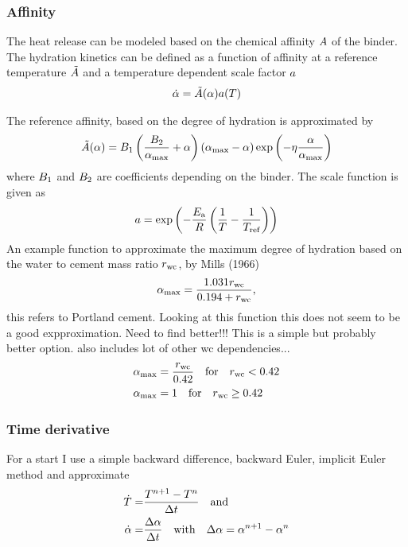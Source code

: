\subsubsection{Affinity}
The heat release can be modeled based on the chemical affinity $A$ of the binder.
The hydration kinetics can be defined as a function of affinity at a reference temperature $\tilde{A}$ and a temperature dependent scale factor ${a}$
\begin{align}
	\dot{\alpha} = \tilde{A}(\alpha){a}(T)\label{eq:affinitydot}
\end{align}


The reference affinity, based on the degree of hydration is approximated by
\begin{align}
	\tilde{A}(\alpha) = B_1 \left(\frac{B_2}{\alpha_{\text{max}}} + \alpha\right) (\alpha_{\text{max}} - \alpha)\exp\left(-\eta \frac{\alpha}{\alpha_{\text{max}}}\right)
\end{align}
where $B_1$ and $B_2$ are coefficients depending on the binder.
The scale function is given as
\begin{align}
	a = \exp\left(-\frac{E_{\text{a}}}{R}\left(\dfrac{1}{T}-\dfrac{1}{T_{\text{ref}}}\right)\right)
\end{align}
An example function to approximate the maximum degree of hydration based on the water to cement mass ratio $r_{\text{wc}}$, by Mills (1966)
\begin{align}
	\alpha_{\text{max}} = \dfrac{1.031r_{\text{wc}}}{0.194 + r_{\text{wc}}},
\end{align}
this refers to Portland cement. Looking at this function this does not seem to be a good expproximation. Need to find better!!!
This is a simple but probably better option.
\cite{pic_2011_uqso} also includes lot of other wc dependencies...\\
\begin{align}
\alpha_{\text{max}} &= \frac{r_{\text{wc}}}{0.42}\quad{\text{for}}\quad r_{\text{wc}} < 0.42\\
\alpha_{\text{max}} &= 1\quad{\text{for}}\quad r_{\text{wc}} \ge 0.42
\end{align}

\subsubsection{Time derivative}
For a start I use a simple backward difference, backward Euler, implicit Euler method and approximate
\begin{align}
	\dot{T} =& \dfrac{T^{n+1}-T^{n}}{\Delta t} \quad\text{and}\label{eq:timediscr}\\
	\dot{\alpha} =& \dfrac{\Delta \alpha}{\Delta t}  \quad\text{with}\quad
	\Delta \alpha  = \alpha^{n+1}- \alpha^{n}
	\label{eq:timediscr2}
\end{align}
